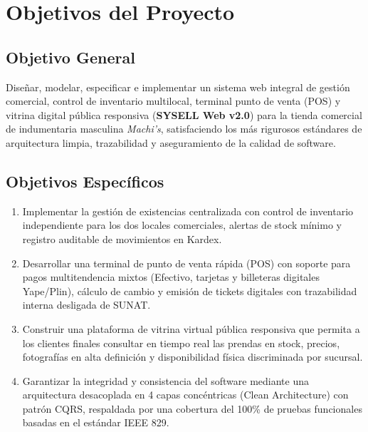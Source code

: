\section{Objetivos del Proyecto}

\subsection{Objetivo General}
Diseñar, modelar, especificar e implementar un sistema web integral de gestión comercial, control de inventario multilocal, terminal punto de venta (POS) y vitrina digital pública responsiva (\textbf{SYSELL Web v2.0}) para la tienda comercial de indumentaria masculina \textit{Machi's}, satisfaciendo los más rigurosos estándares de arquitectura limpia, trazabilidad y aseguramiento de la calidad de software.

\subsection{Objetivos Específicos}
\begin{enumerate}
    \item Implementar la gestión de existencias centralizada con control de inventario independiente para los dos locales comerciales, alertas de stock mínimo y registro auditable de movimientos en Kardex.
    \item Desarrollar una terminal de punto de venta rápida (POS) con soporte para pagos multitendencia mixtos (Efectivo, tarjetas y billeteras digitales Yape/Plin), cálculo de cambio y emisión de tickets digitales con trazabilidad interna desligada de SUNAT.
    \item Construir una plataforma de vitrina virtual pública responsiva que permita a los clientes finales consultar en tiempo real las prendas en stock, precios, fotografías en alta definición y disponibilidad física discriminada por sucursal.
    \item Garantizar la integridad y consistencia del software mediante una arquitectura desacoplada en 4 capas concéntricas (Clean Architecture) con patrón CQRS, respaldada por una cobertura del 100\% de pruebas funcionales basadas en el estándar IEEE 829.
\end{enumerate}
